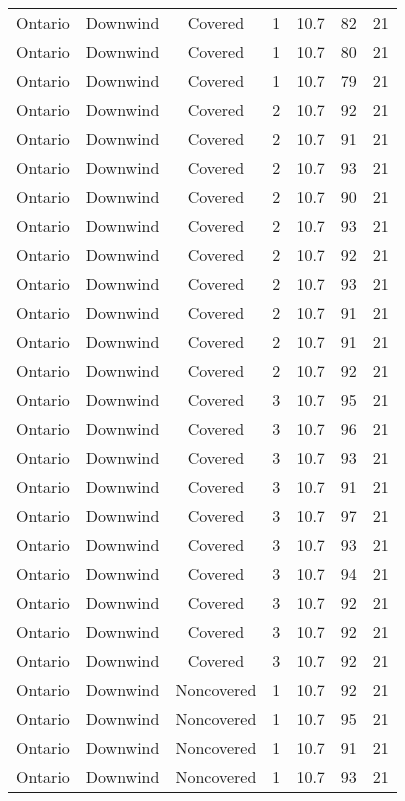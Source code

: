 \documentclass{article}
\begin{document}
\begin{longtable}[H]{ccccccc}
Ontario & Downwind & Covered     & 1 & 10.7 & 82  & 21 \\
Ontario & Downwind & Covered     & 1 & 10.7 & 80  & 21 \\
Ontario & Downwind & Covered     & 1 & 10.7 & 79  & 21 \\
Ontario & Downwind & Covered     & 2 & 10.7 & 92  & 21 \\
Ontario & Downwind & Covered     & 2 & 10.7 & 91  & 21 \\
Ontario & Downwind & Covered     & 2 & 10.7 & 93  & 21 \\
Ontario & Downwind & Covered     & 2 & 10.7 & 90  & 21 \\
Ontario & Downwind & Covered     & 2 & 10.7 & 93  & 21 \\
Ontario & Downwind & Covered     & 2 & 10.7 & 92  & 21 \\
Ontario & Downwind & Covered     & 2 & 10.7 & 93  & 21 \\
Ontario & Downwind & Covered     & 2 & 10.7 & 91  & 21 \\
Ontario & Downwind & Covered     & 2 & 10.7 & 91  & 21 \\
Ontario & Downwind & Covered     & 2 & 10.7 & 92  & 21 \\
Ontario & Downwind & Covered     & 3 & 10.7 & 95  & 21 \\
Ontario & Downwind & Covered     & 3 & 10.7 & 96  & 21 \\
Ontario & Downwind & Covered     & 3 & 10.7 & 93  & 21 \\
Ontario & Downwind & Covered     & 3 & 10.7 & 91  & 21 \\
Ontario & Downwind & Covered     & 3 & 10.7 & 97  & 21 \\
Ontario & Downwind & Covered     & 3 & 10.7 & 93  & 21 \\
Ontario & Downwind & Covered     & 3 & 10.7 & 94  & 21 \\
Ontario & Downwind & Covered     & 3 & 10.7 & 92  & 21 \\
Ontario & Downwind & Covered     & 3 & 10.7 & 92  & 21 \\
Ontario & Downwind & Covered     & 3 & 10.7 & 92  & 21 \\
Ontario & Downwind & Noncovered & 1 & 10.7 & 92  & 21 \\
Ontario & Downwind & Noncovered & 1 & 10.7 & 95  & 21 \\
Ontario & Downwind & Noncovered & 1 & 10.7 & 91  & 21 \\
Ontario & Downwind & Noncovered & 1 & 10.7 & 93  & 21 \\

\end{longtable}
\end{document}
